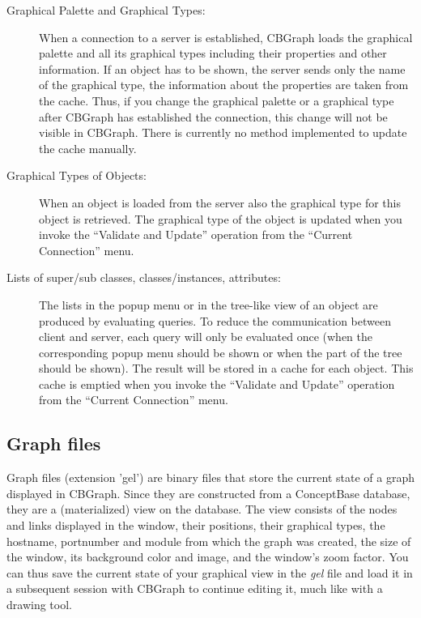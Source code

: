 \begin{description}
\item[Graphical Palette and Graphical Types:]
When a connection to a server is established, CBGraph
loads the graphical palette and all its graphical types including
their properties and other information. If an
object has to be shown, the server sends only the name of the graphical
type, the information about the properties are taken from
the cache. Thus, if you change the graphical palette
or a graphical type after CBGraph has established the
connection, this change will not be visible in CBGraph.
There is currently no method implemented to update the cache manually.

\item[Graphical Types of Objects:]
When an object is loaded from the server also the graphical type
for this object is retrieved. The graphical type of the object
is updated when you invoke the ``Validate and Update'' operation from the
``Current Connection'' menu.

\item[Lists of super/sub classes, classes/instances, attributes:]
The lists in the popup menu or in the tree-like view of an object
are produced by evaluating queries. To reduce the communication between
client and server, each query will only be evaluated once (when the corresponding
popup menu should be shown or when the part of the tree should be shown).
The result will be stored in a cache for each object. This cache is emptied
when you invoke the ``Validate and Update'' operation from the
``Current Connection'' menu.
\end{description}


\subsection{Graph files}
\label{sec:gel}

Graph files (extension 'gel') are binary files that store the current state of
a graph displayed in CBGraph. Since they are constructed from a
ConceptBase database, they are a (materialized) view on the database.
The view consists of the nodes and links displayed in the window, their positions,
their graphical types, the hostname, portnumber and module from which the graph was created,
the size of the window, its background color and image, and the window's zoom factor. 
You can thus save the current state of your graphical view in the {\em gel\/} file
and load it in a subsequent session with CBGraph to continue editing it,
much like with a drawing tool. 

